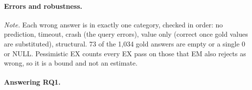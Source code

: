 \paragraph{Errors and robustness.}

\begin{table}[htbp]
\centering
\caption{Wrong answers by cause, and EX when possibly accidental passes are counted as wrong.}
\label{tab:errors}
\small
\setlength{\tabcolsep}{4pt}


\vspace{2pt}
\begin{minipage}{0.95\linewidth}\footnotesize
\textit{Note.} Each wrong answer is in exactly one category, checked in order: no prediction, timeout, crash (the query errors), value only (correct once gold values are substituted), structural. 73 of the 1,034 gold answers are empty or a single 0 or NULL. Pessimistic EX counts every EX pass on those that EM also rejects as wrong, so it is a bound and not an estimate.
\end{minipage}
\end{table}

\paragraph{Answering RQ1.}
